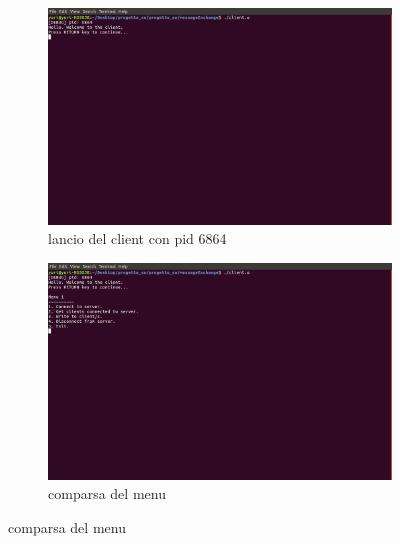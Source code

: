 \begin{figure}[!h]
\centering
\begin{subfigure}[b]{0.8\textwidth}\includegraphics[width=\textwidth]{screenmsg/1_client_6864}\caption{lancio del client con pid 6864}
\end{subfigure}

\begin{subfigure}[b]{0.8\textwidth}\includegraphics[width=\textwidth]{screenmsg/2_client_6864}
\caption{comparsa del menu}
\end{subfigure}
\end{figure}


